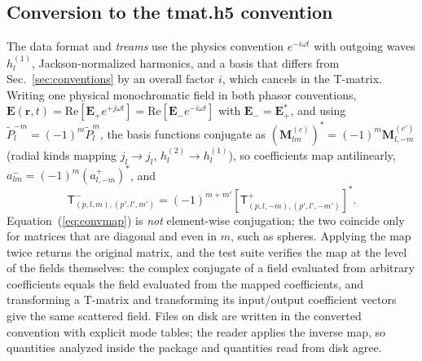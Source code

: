 \documentclass[11pt]{article}
\newcommand{\rr}{\mathbf{r}}
\newcommand{\EE}{\mathbf{E}}
\newcommand{\Mv}[1]{\mathbf{M}^{(#1)}}
\newcommand{\Ptil}{\widetilde{P}}
\begin{document}
\subsection{Conversion to the tmat.h5 convention}
\label{sec:treamsconv}
The data format \cite{Asadova2025format} and \emph{treams}
\cite{Beutel2024treams} use the physics convention $e^{-i\omega t}$ with
outgoing waves $h_l^{(1)}$, Jackson-normalized harmonics, and a basis
that differs from Sec.~\ref{sec:conventions} by an overall factor $i$,
which cancels in the T-matrix.  Writing one physical monochromatic field
in both phasor conventions, $\EE(\rr,t) = \mathrm{Re}[\EE_+ e^{+j\omega
t}] = \mathrm{Re}[\EE_- e^{-i\omega t}]$ with $\EE_- = \EE_+^*$, and
using $\Ptil_l^{-m} = (-1)^m \Ptil_l^m$, the basis functions conjugate as
$(\Mv{c}_{lm})^* = (-1)^m \Mv{c'}_{l,-m}$ (radial kinds mapping
$j_l \to j_l$, $h^{(2)}_l \to h^{(1)}_l$), so coefficients map
antilinearly, $a^-_{lm} = (-1)^m (a^+_{l,-m})^*$, and
\begin{equation}
\mathsf{T}^-_{(p,l,m),(p',l',m')}
 = (-1)^{m+m'} \left[\mathsf{T}^+_{(p,l,-m),(p',l',-m')}\right]^{*}.
\label{eq:convmap}
\end{equation}
Equation~(\ref{eq:convmap}) is \emph{not} element-wise conjugation; the
two coincide only for matrices that are diagonal and even in $m$, such
as spheres.  Applying the map twice returns the original matrix, and
the test suite verifies the map at the level of the fields themselves:
the complex conjugate of a field evaluated from arbitrary coefficients
equals the field evaluated from the mapped coefficients, and
transforming a T-matrix and transforming its input/output coefficient
vectors give the same scattered field.  Files on disk are written in
the converted convention with explicit mode tables; the reader applies
the inverse map, so quantities analyzed inside the package and
quantities read from disk agree.

\end{document}
